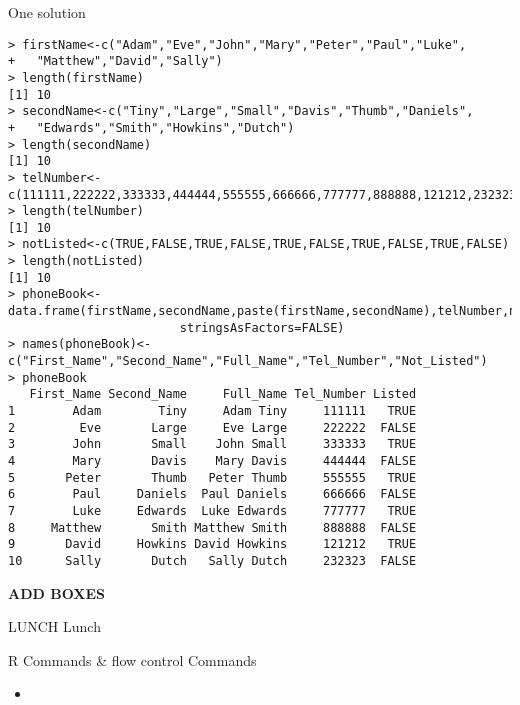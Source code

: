 \documentclass{beamer}
\begin{document}
\begin{frame}{One solution}
\begin{verbatim}
> firstName<-c("Adam","Eve","John","Mary","Peter","Paul","Luke",
+	"Matthew","David","Sally")‏
> length(firstName)‏
[1] 10
> secondName<-c("Tiny","Large","Small","Davis","Thumb","Daniels",
+	"Edwards","Smith","Howkins","Dutch")‏
> length(secondName)‏
[1] 10
> telNumber<-c(111111,222222,333333,444444,555555,666666,777777,888888,121212,232323)‏
> length(telNumber)‏
[1] 10
> notListed<-c(TRUE,FALSE,TRUE,FALSE,TRUE,FALSE,TRUE,FALSE,TRUE,FALSE)‏
> length(notListed)‏
[1] 10
> phoneBook<-data.frame(firstName,secondName,paste(firstName,secondName),telNumber,notListed, 
                        stringsAsFactors=FALSE)‏
> names(phoneBook)<-c("First_Name","Second_Name","Full_Name","Tel_Number","Not_Listed")‏
> phoneBook
   First_Name Second_Name     Full_Name Tel_Number Listed
1        Adam        Tiny     Adam Tiny     111111   TRUE
2         Eve       Large     Eve Large     222222  FALSE
3        John       Small    John Small     333333   TRUE
4        Mary       Davis    Mary Davis     444444  FALSE
5       Peter       Thumb   Peter Thumb     555555   TRUE
6        Paul     Daniels  Paul Daniels     666666  FALSE
7        Luke     Edwards  Luke Edwards     777777   TRUE
8     Matthew       Smith Matthew Smith     888888  FALSE
9       David     Howkins David Howkins     121212   TRUE
10      Sally       Dutch   Sally Dutch     232323  FALSE\end{verbatim}
\textbf{ADD BOXES}
\end{frame}

\begin{frame}{LUNCH}
Lunch
\end{frame}

\begin{frame}{R Commands \& flow control}
Commands
\end{frame}


\begin{frame}{}
    \begin{itemize}
        \item
        \begin{verbatim}
        \end{verbatim}
    \end{itemize}
\end{frame}
\end{document}
